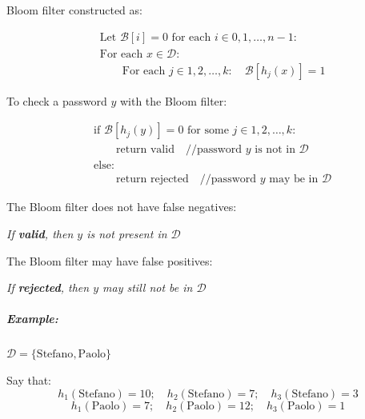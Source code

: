 \documentclass{article}
\begin{document}
                    Bloom filter constructed as:
                  
                   \[
                    \begin{aligned}
                    & \text{Let } \mathcal{B}[i] = 0 \text{ for each } i \in 0, 1, \ldots, n-1:\\                
                    & \text{For each } x \in \mathcal{D}:\\
                    & \qquad \text{For each } j \in 1, 2, \ldots, k: \quad \mathcal{B}[h_j(x)] = 1
                    \end{aligned}
                    \]

                    To check a password \( y \) with the Bloom filter:
             
                                            
                    \[
                    \begin{aligned}
                    & \text{if } \mathcal{B}[h_j(y)] = 0 \text{ for some } j \in 1, 2, \ldots, k: \\
                    & \qquad \text{return } \text{valid} \quad // \text{password } y \text{ is not in } \mathcal{D} \\
                    & \text{else:} \\
                    & \qquad \text{return } \text{rejected} \quad // \text{password } y \text{ may be in } \mathcal{D}
                    \end{aligned}
                    \]


                    The Bloom filter does not have false negatives:
                   
                        \textit{If \textbf{valid}, then \( y \) is not present in \( \mathcal{D} \)}
                    

                    The Bloom filter may have false positives:
                    
                        \textit{If \textbf{rejected}, then \( y \) may still not be in \( \mathcal{D} \)}
                       
                        \subparagraph{Example:} \( \mathcal{D} = \{ \text{Stefano}, \text{Paolo} \} \)

                        Say that:
                        \[
                        h_1(\text{Stefano}) = 10; \quad h_2(\text{Stefano}) = 7; \quad h_3(\text{Stefano}) = 3
                        \]
                        \[
                        h_1(\text{Paolo}) = 7; \quad h_2(\text{Paolo}) = 12; \quad h_3(\text{Paolo}) = 1
                        \]
                        
\end{document}
